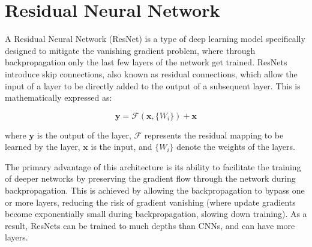 \section{Residual Neural Network}


A Residual Neural Network (ResNet) is a type of deep learning model specifically designed to mitigate the vanishing gradient problem, where through backpropagation only the last few layers of the network get trained. ResNets introduce skip connections, also known as residual connections, which allow the input of a layer to be directly added to the output of a subsequent layer. This is mathematically expressed as:

\[
	\mathbf{y} = \mathcal{F}(\mathbf{x}, \{W_i\}) + \mathbf{x}
\]

where $\mathbf{y}$ is the output of the layer, $\mathcal{F}$ represents the residual mapping to be learned by the layer, $\mathbf{x}$ is the input, and $\{W_i\}$ denote the weights of the layers.

The primary advantage of this architecture is its ability to facilitate the training of deeper networks by preserving the gradient flow through the network during backpropagation. This is achieved by allowing the backpropagation to bypass one or more layers, reducing the risk of gradient vanishing (where update gradients become exponentially small during backpropagation, slowing down training). As a result, ResNets can be trained to much depths than CNNs, and can have more layers.





